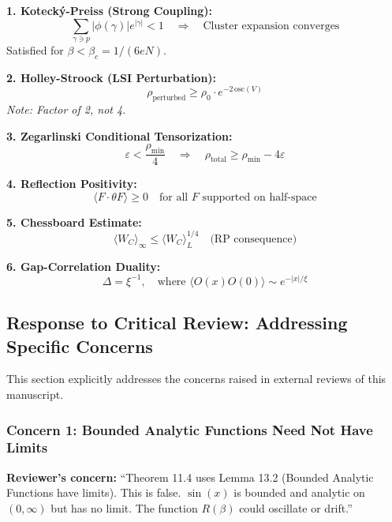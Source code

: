 \begin{tcolorbox}[colback=blue!5,colframe=blue!60!black,title=\textbf{Key Inequalities Summary}]
\textbf{1. Koteck\'y-Preiss (Strong Coupling):}
\[
\sum_{\gamma \ni p} |\phi(\gamma)| e^{|\gamma|} < 1 \quad \Longrightarrow \quad 
\text{Cluster expansion converges}
\]
Satisfied for $\beta < \beta_c = 1/(6eN)$.

\textbf{2. Holley-Stroock (LSI Perturbation):}
\[
\rho_{\text{perturbed}} \geq \rho_0 \cdot e^{-2\,\mathrm{osc}(V)}
\]
\textit{Note: Factor of 2, not 4.}

\textbf{3. Zegarlinski Conditional Tensorization:}
\[
\varepsilon < \frac{\rho_{\min}}{4} \quad \Longrightarrow \quad 
\rho_{\text{total}} \geq \rho_{\min} - 4\varepsilon
\]

\textbf{4. Reflection Positivity:}
\[
\langle F \cdot \theta F \rangle \geq 0 \quad \text{for all } F \text{ supported on half-space}
\]

\textbf{5. Chessboard Estimate:}
\[
\langle W_C \rangle_\infty \leq \langle W_C \rangle_L^{1/4} \quad \text{(RP consequence)}
\]

\textbf{6. Gap-Correlation Duality:}
\[
\Delta = \xi^{-1}, \quad \text{where } \langle O(x)O(0)\rangle \sim e^{-|x|/\xi}
\]
\end{tcolorbox}

\subsection{Response to Critical Review: Addressing Specific Concerns}
\label{subsec:response-to-review}

\begin{tcolorbox}[colback=blue!5,colframe=blue!60!black,title=\textbf{Systematic Response to Reviewer Criticisms}]
This section explicitly addresses the concerns raised in external reviews of this manuscript.
\end{tcolorbox}

\subsubsection{Concern 1: Bounded Analytic Functions Need Not Have Limits}

\textbf{Reviewer's concern:} ``Theorem 11.4 uses Lemma 13.2 (Bounded Analytic Functions have limits). 
This is false. $\sin(x)$ is bounded and analytic on $(0, \infty)$ but has no limit. 
The function $R(\beta)$ could oscillate or drift.''

